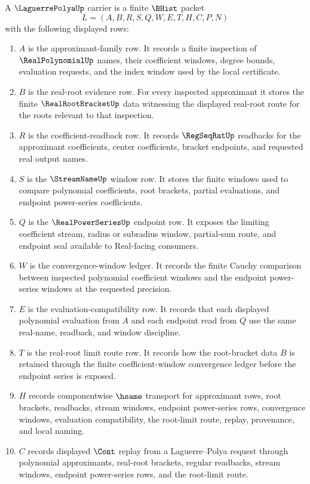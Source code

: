 \begin{definition}
\label{def:laguerre-polya-carrier}
A $\LaguerrePolyaUp$ carrier is a finite $\BHist$ packet
$$
L=(A,B,R,S,Q,W,E,T,H,C,P,N)
$$
with the following displayed rows:
\begin{enumerate}
\item $A$ is the approximant-family row. It records a finite inspection of $\RealPolynomialUp$ names, their coefficient windows, degree bounds, evaluation requests, and the index window used by the local certificate.
\item $B$ is the real-root evidence row. For every inspected approximant it stores the finite $\RealRootBracketUp$ data witnessing the displayed real-root route for the roots relevant to that inspection.
\item $R$ is the coefficient-readback row. It records $\RegSeqRatUp$ readbacks for the approximant coefficients, center coefficients, bracket endpoints, and requested real output names.
\item $S$ is the $\StreamNameUp$ window row. It stores the finite windows used to compare polynomial coefficients, root brackets, partial evaluations, and endpoint power-series coefficients.
\item $Q$ is the $\RealPowerSeriesUp$ endpoint row. It exposes the limiting coefficient stream, radius or subradius window, partial-sum route, and endpoint seal available to Real-facing consumers.
\item $W$ is the convergence-window ledger. It records the finite Cauchy comparison between inspected polynomial coefficient windows and the endpoint power-series windows at the requested precision.
\item $E$ is the evaluation-compatibility row. It records that each displayed polynomial evaluation from $A$ and each endpoint read from $Q$ use the same real-name, readback, and window discipline.
\item $T$ is the real-root limit route row. It records how the root-bracket data $B$ is retained through the finite coefficient-window convergence ledger before the endpoint series is exposed.
\item $H$ records componentwise $\hsame$ transport for approximant rows, root brackets, readbacks, stream windows, endpoint power-series rows, convergence windows, evaluation compatibility, the root-limit route, replay, provenance, and local naming.
\item $C$ records displayed $\Cont$ replay from a Laguerre--Polya request through polynomial approximants, real-root brackets, regular readbacks, stream windows, endpoint power-series rows, and the root-limit route.

\end{enumerate}
\end{definition}
